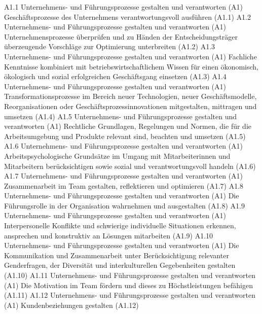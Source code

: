 \templateCard
  {A1.1}
  {Unternehmens- und Führungsprozesse gestalten und verantworten (A1)}
  {Geschäftsprozesse des Unternehmens verantwortungsvoll ausführen (A1.1)}
\templateCard
  {A1.2}
  {Unternehmens- und Führungsprozesse gestalten und verantworten (A1)}
  {Unternehmensprozesse überprüfen und zu Händen der Entscheidungsträger überzeugende Vorschläge zur Optimierung unterbreiten (A1.2)}
\templateCard
  {A1.3}
  {Unternehmens- und Führungsprozesse gestalten und verantworten (A1)}
  {Fachliche Kenntnisse kombiniert mit betriebswirtschaftlichem Wissen für einen ökonomisch, ökologisch und sozial erfolgreichen Geschäftsgang einsetzen (A1.3)}
\templateCard
  {A1.4}
  {Unternehmens- und Führungsprozesse gestalten und verantworten (A1)}
  {Transformationsprozesse im Bereich neuer Technologien, neuer Geschäftsmodelle, Reorganisationen oder Geschäftsprozessinnovationen mitgestalten, mittragen und umsetzen (A1.4)}
\templateCard
  {A1.5}
  {Unternehmens- und Führungsprozesse gestalten und verantworten (A1)}
  {Rechtliche Grundlagen, Regelungen und Normen, die für die Arbeitsumgebung und Produkte relevant sind, beachten und umsetzen (A1.5)}
\templateCard
  {A1.6}
  {Unternehmens- und Führungsprozesse gestalten und verantworten (A1)}
  {Arbeitspsychologische Grundsätze im Umgang mit Mitarbeiterinnen und Mitarbeitern berücksichtigen sowie sozial und verantwortungsvoll handeln (A1.6)}
\templateCard
  {A1.7}
  {Unternehmens- und Führungsprozesse gestalten und verantworten (A1)}
  {Zusammenarbeit im Team gestalten, reflektieren und optimieren (A1.7)}
\templateCard
  {A1.8}
  {Unternehmens- und Führungsprozesse gestalten und verantworten (A1)}
  {Die Führungsrolle in der Organisation wahrnehmen und ausgestalten (A1.8)}
\templateCard
  {A1.9}
  {Unternehmens- und Führungsprozesse gestalten und verantworten (A1)}
  {Interpersonelle Konflikte und schwierige individuelle Situationen erkennen, ansprechen und konstruktiv an Lösungen mitarbeiten (A1.9)}
\templateCard
  {A1.10}
  {Unternehmens- und Führungsprozesse gestalten und verantworten (A1)}
  {Die Kommunikation und Zusammenarbeit unter Berücksichtigung relevanter Genderfragen, der Diversität und interkulturellen Gegebenheiten gestalten (A1.10)}
\templateCard
  {A1.11}
  {Unternehmens- und Führungsprozesse gestalten und verantworten (A1)}
  {Die Motivation im Team fördern und dieses zu Höchstleistungen befähigen (A1.11)}
\templateCard
  {A1.12}
  {Unternehmens- und Führungsprozesse gestalten und verantworten (A1)}
  {Kundenbeziehungen gestalten (A1.12)}
